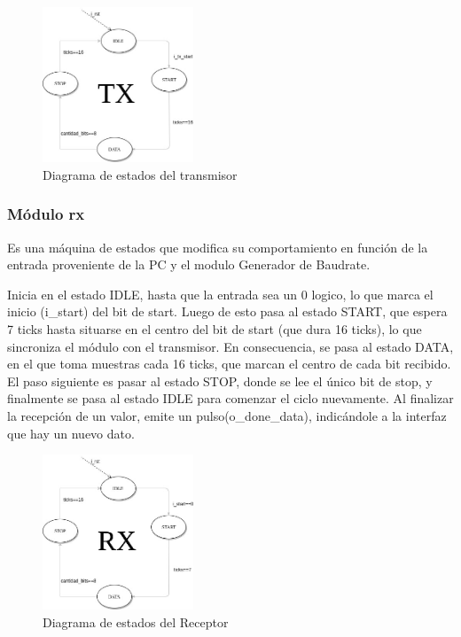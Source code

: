 \documentclass[a4paper]{article}
\begin{document}
\begin{figure}[!htb]
\centering
\includegraphics[width=0.4\textwidth]{tx_tp2.jpeg}
\caption{\label{fig:tests}Diagrama de estados del transmisor}
\end{figure}

\subsubsection{Módulo rx}
Es una máquina de estados que modifica su comportamiento en función de la entrada proveniente de la PC y el modulo Generador de Baudrate. 

Inicia en el estado IDLE, hasta que la entrada sea un 0 logico, lo que marca el inicio (i\_start) del bit de start. Luego de esto pasa al estado START, que espera 7 ticks hasta situarse en el centro del bit de start (que dura 16 ticks), lo que sincroniza el módulo con el transmisor. En consecuencia, se pasa al estado DATA, en el que toma muestras cada 16 ticks, que marcan el centro de cada bit recibido. El paso siguiente es pasar al estado STOP, donde se lee el único bit de stop, y finalmente se pasa al estado IDLE para comenzar el ciclo nuevamente. Al finalizar la recepción de un valor, emite un pulso(o\_done\_data), indicándole a la interfaz que hay un nuevo dato.

\begin{figure}[!htb]
\centering
\includegraphics[width=0.4\textwidth]{rx_tp2.jpeg}
\caption{\label{fig:tests}Diagrama de estados del Receptor}
\end{figure}
\end{document}
